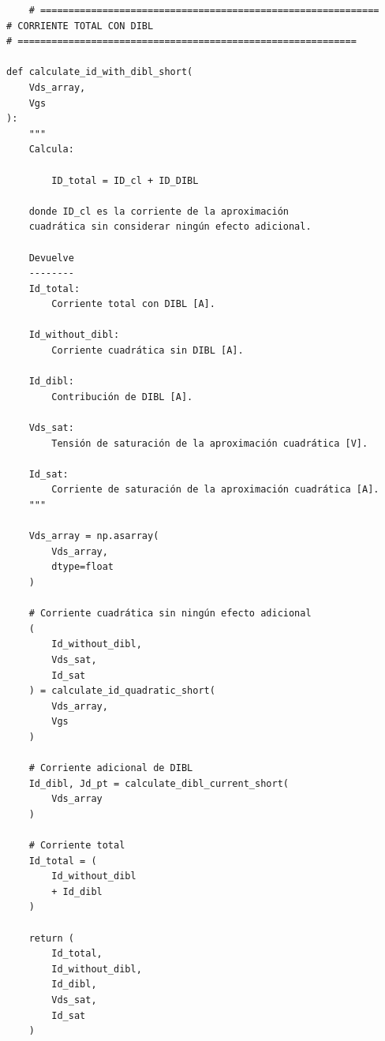 \documentclass[a4paper, twoside, 10pt, spanish]{article}
\numberwithin{table}{section}
\begin{document}
\begin{verbatim}
    # ============================================================
# CORRIENTE TOTAL CON DIBL
# ============================================================

def calculate_id_with_dibl_short(
    Vds_array,
    Vgs
):
    """
    Calcula:

        ID_total = ID_cl + ID_DIBL

    donde ID_cl es la corriente de la aproximación
    cuadrática sin considerar ningún efecto adicional.

    Devuelve
    --------
    Id_total:
        Corriente total con DIBL [A].

    Id_without_dibl:
        Corriente cuadrática sin DIBL [A].

    Id_dibl:
        Contribución de DIBL [A].

    Vds_sat:
        Tensión de saturación de la aproximación cuadrática [V].

    Id_sat:
        Corriente de saturación de la aproximación cuadrática [A].
    """

    Vds_array = np.asarray(
        Vds_array,
        dtype=float
    )

    # Corriente cuadrática sin ningún efecto adicional
    (
        Id_without_dibl,
        Vds_sat,
        Id_sat
    ) = calculate_id_quadratic_short(
        Vds_array,
        Vgs
    )

    # Corriente adicional de DIBL
    Id_dibl, Jd_pt = calculate_dibl_current_short(
        Vds_array
    )

    # Corriente total
    Id_total = (
        Id_without_dibl
        + Id_dibl
    )

    return (
        Id_total,
        Id_without_dibl,
        Id_dibl,
        Vds_sat,
        Id_sat
    )
\end{verbatim}
\end{document}
